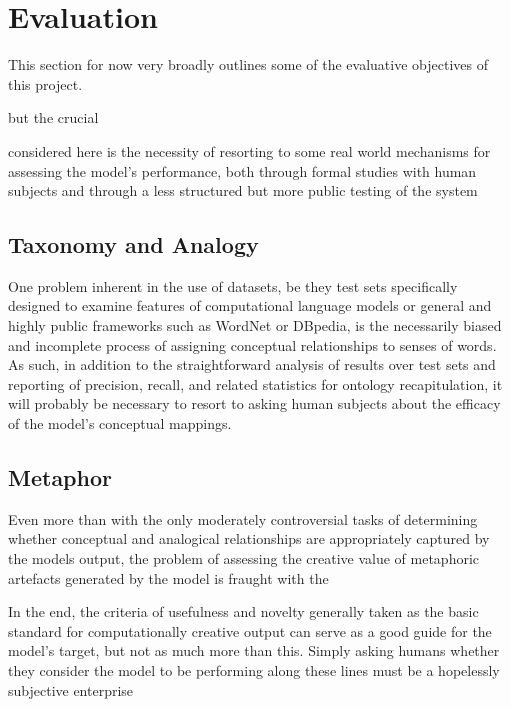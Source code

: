 \chapter{Evaluation}
This section for now very broadly outlines some of the evaluative objectives of this project.

but the crucial

considered here is the necessity of resorting to some real world mechanisms for assessing the model's performance, both through formal studies with human subjects and through a less structured but more public testing of the system 

\section{Taxonomy and Analogy}
One problem inherent in the use of datasets, be they test sets specifically designed to examine features of computational language models or general and highly public frameworks such as WordNet or DBpedia, is the necessarily biased and incomplete process of assigning conceptual relationships to senses of words.  As such, in addition to the straightforward analysis of results over test sets and reporting of precision, recall, and related statistics for ontology recapitulation, it will probably be necessary to resort to asking human subjects about the efficacy of the model's conceptual mappings.

\section{Metaphor}
Even more than with the only moderately controversial tasks of determining whether conceptual and analogical relationships are appropriately captured by the models output, the problem of assessing the creative value of metaphoric artefacts generated by the model is fraught with the 

In the end, the criteria of usefulness and novelty generally taken as the basic standard for computationally creative output can serve as a good guide for the model's target, but not as much more than this.  Simply asking humans whether they consider the model to be performing along these lines must be a hopelessly subjective enterprise
